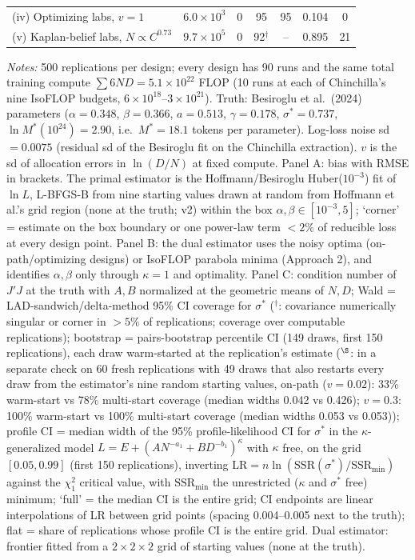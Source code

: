 \begin{table}[!htbp]
\begin{threeparttable}
\begin{tabular}{lcccccc}
(iv) Optimizing labs, $v=1$ & $6.0\times10^{3}$ & 0 & 95 & 95 & 0.104 & 0 \\
(v) Kaplan-belief labs, $N\propto C^{0.73}$ & $9.7\times10^{5}$ & 0 & 92$^{\dagger}$ & -- & 0.895 & 21 \\
\bottomrule
\end{tabular}
\begin{tablenotes}[flushleft]\footnotesize
\item \textit{Notes:} 500 replications per design; every design has 90 runs and the same total training compute $\sum 6ND = 5.1\times10^{22}$ FLOP (10 runs at each of Chinchilla's nine IsoFLOP budgets, $6\times10^{18}$--$3\times10^{21}$). Truth: Besiroglu et al.\ (2024) parameters ($\alpha=0.348$, $\beta=0.366$, $a=0.513$, $\gamma=0.178$, $\sigma^*=0.737$, $\ln M^*(10^{24})=2.90$, i.e.\ $M^*=18.1$ tokens per parameter). Log-loss noise sd $=0.0075$ (residual sd of the Besiroglu fit on the Chinchilla extraction). $v$ is the sd of allocation errors in $\ln(D/N)$ at fixed compute. Panel A: bias with RMSE in brackets. The primal estimator is the Hoffmann/Besiroglu Huber($10^{-3}$) fit of $\ln L$, L-BFGS-B from nine starting values drawn at random from Hoffmann et al.'s grid region (none at the truth; v2) within the box $\alpha,\beta\in[10^{-3},5]$; `corner' = estimate on the box boundary or one power-law term $<2\%$ of reducible loss at every design point. Panel B: the dual estimator uses the noisy optima (on-path/optimizing designs) or IsoFLOP parabola minima (Approach 2), and identifies $\alpha,\beta$ only through $\kappa=1$ and optimality. Panel C: condition number of $J'J$ at the truth with $A,B$ normalized at the geometric means of $N,D$; Wald = LAD-sandwich/delta-method 95\% CI coverage for $\sigma^*$ ($^{\dagger}$: covariance numerically singular or corner in $>5\%$ of replications; coverage over computable replications); bootstrap = pairs-bootstrap percentile CI (149 draws, first 150 replications), each draw warm-started at the replication's estimate ($^{\S}$: in a separate check on 60 fresh replications with 49 draws that also restarts every draw from the estimator's nine random starting values, on-path ($v=0.02$): 33\% warm-start vs 78\% multi-start coverage (median widths 0.042 vs 0.426); $v=0.3$: 100\% warm-start vs 100\% multi-start coverage (median widths 0.053 vs 0.053)); profile CI = median width of the 95\% profile-likelihood CI for $\sigma^*$ in the $\kappa$-generalized model $L=E+(AN^{-a_1}+BD^{-b_1})^{\kappa}$ with $\kappa$ free, on the grid $[0.05,0.99]$ (first 150 replications), inverting LR$=n\ln(\mathrm{SSR}(\sigma^*)/\mathrm{SSR}_{\min})$ against the $\chi^2_1$ critical value, with $\mathrm{SSR}_{\min}$ the unrestricted ($\kappa$ and $\sigma^*$ free) minimum; `full' = the median CI is the entire grid; CI endpoints are linear interpolations of LR between grid points (spacing 0.004--0.005 next to the truth); flat = share of replications whose profile CI is the entire grid. Dual estimator: frontier fitted from a $2\times2\times2$ grid of starting values (none at the truth).
\end{tablenotes}
\end{threeparttable}
\end{table}
